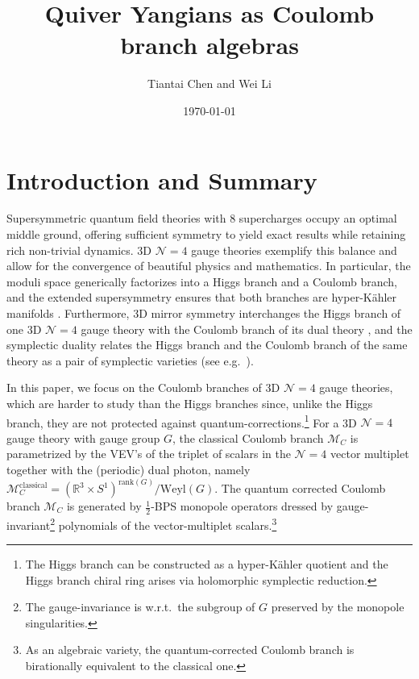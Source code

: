 \documentclass[12pt,a4paper]{article}
\title{Quiver Yangians as Coulomb branch algebras}
\author{Tiantai Chen and Wei Li}
\affiliation{Institute of Theoretical Physics, Chinese Academy of Sciences,\\
Zhongguancun East Road 55, Haidian, 100190 Beijing, P.R.\ China}
\date{\today}
\renewcommand{\(}{\left(}
\renewcommand{\)}{\right)}
\renewcommand{\(}{\left(}
\renewcommand{\)}{\right)}
\begin{document}
\maketitle




\section{Introduction and Summary}
\label{sec:Intro}

Supersymmetric quantum field theories with $8$ supercharges occupy an optimal middle ground, offering sufficient symmetry to yield exact results while retaining rich non-trivial dynamics. 
3D $\mathcal{N}=4$ gauge theories exemplify this balance and allow for the convergence of beautiful physics and mathematics. 
In particular, the moduli space generically factorizes into a Higgs branch and a Coulomb branch, and the extended supersymmetry ensures that both branches are hyper-K\"ahler manifolds \cite{Seiberg:1996nz}. 
Furthermore, 3D mirror symmetry interchanges the Higgs  branch of one  3D $\mathcal{N}=4$ gauge theory with the Coulomb branch of its dual theory \cite{Intriligator:1996ex,Hanany_1997,Aharony_1997}, and the symplectic duality relates the Higgs branch and the Coulomb branch of the same theory as a pair of symplectic varieties (see e.g.\ \cite{braden2022quantizationsconicalsymplecticresolutions,Bullimore:2016nji,kamnitzer2022symplecticresolutionssymplecticduality}).

\medskip

In this paper, we focus on the Coulomb branches of 3D $\mathcal{N}=4$ gauge theories, which are harder to study than the Higgs branches since, unlike the Higgs branch, they are not protected against  quantum-corrections.\footnote{The Higgs branch can be constructed as a hyper-K\"ahler quotient and the Higgs branch chiral ring arises via holomorphic symplectic reduction.} 
For a 3D $\mathcal{N}=4$ gauge theory with gauge group $G$, the classical Coulomb branch $\mathcal{M}_{C}$ is parametrized by the VEV's of the triplet of scalars in the $\mathcal{N}=4$ vector multiplet together with the (periodic) dual photon, namely $\mathcal{M}^{\textrm{classical}}_C=(\mathbb{R}^3\times S^1)^{\textrm{rank}(G)}/\textrm{Weyl}(G)$. 
The quantum corrected Coulomb branch $\mathcal{M}_C$ is generated by $\frac{1}{2}$-BPS monopole operators dressed by gauge-invariant\footnote{The gauge-invariance is w.r.t.\ the subgroup of $G$ preserved by the monopole singularities.} polynomials of the vector-multiplet scalars.\footnote{As an algebraic variety, the quantum-corrected Coulomb branch is birationally equivalent to the classical one.}
\end{document}
